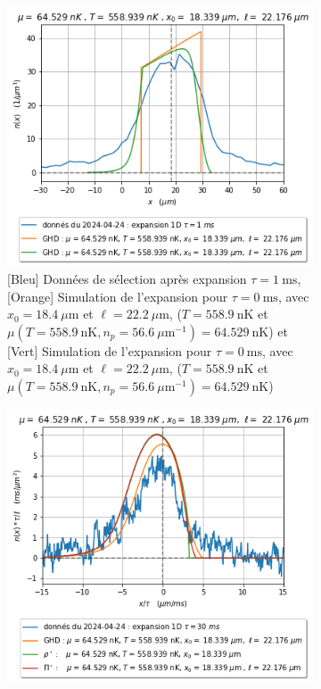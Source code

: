 \documentclass[a3, 10pt,twoside]{article}          %
\theoremstyle{plain}
\theoremstyle{definition}
\theoremstyle{remark}
\theoremstyle{definition} %
\begin{document}
\begin{figure}[H]
    \begin{subfigure}[b]{0.45\textwidth}
        \centering
        \includegraphics[width=\textwidth]{Figures/simul_expansion_1_22}
        \caption{{\color{blue}[Bleu] Données de sélection après expansion $\tau = 1~\text{ms}$}, {\color{orange}[Orange] Simulation de l'expansion pour $\tau = 0~\text{ms}$, avec $x_0 = 18.4~\mu \text{m}$ et $\ell = 22.2~\mu \text{m}$, ($T = 558.9~\text{nK}$ et $\mu(T = 558.9~\text{nK}, n_p = 56.6~\mu \text{m}^{-1}) = 64.529~\text{nK}$)} et {\color{OliveGreen}[Vert] Simulation de l'expansion pour $\tau = 0~\text{ms}$, avec $x_0 = 18.4~\mu \text{m}$ et $\ell = 22.2~\mu \text{m}$, ($T = 558.9~\text{nK}$ et $\mu(T = 558.9~\text{nK}, n_p = 56.6~\mu \text{m}^{-1}) = 64.529~\text{nK}$)}}
        \label{fig:expansion_1_22}
    \end{subfigure}
    \hfill
    \begin{subfigure}[b]{0.45\textwidth}
        \centering
        \includegraphics[width=\textwidth]{Figures/simul_expansion_30_22}

\end{subfigure}
\end{figure}
\end{document}
